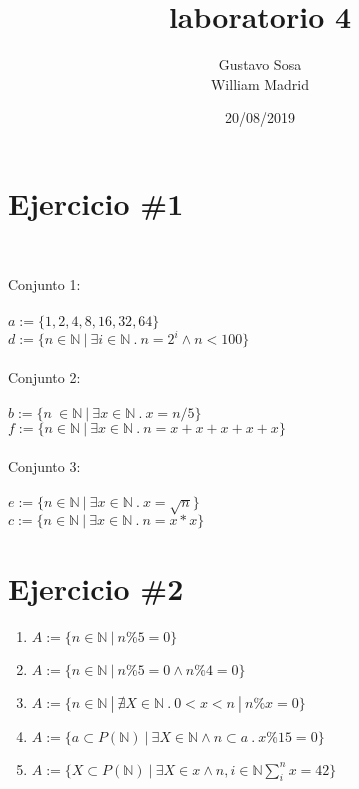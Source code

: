 \documentclass{article}
\title{laboratorio 4}
\author{Gustavo Sosa\\ William Madrid }
\date{20/08/2019}
\begin{document}
\maketitle

\section*{Ejercicio \#1}

\\\setlength{\parindent}{0cm}

        Conjunto 1:\\
        \\
        {$a:=\{1,2,4,8,16,32,64\}$}\\
        {$d:=\{n\in\mathbb{N}\ |\ \exists i\in\mathbb{N}\ .\ n=2^i\wedge n<100 \}$}\\
       \\
        Conjunto 2: \\
        \\
         {$b:=\{n\ \in \mathbb{N}\ |\ \exists x \in \mathbb{N}\ .\ x=n/5 \}$}\\
         {$f:=\{ n\in\mathbb{N}\ |\ \exists x\in \mathbb{N}\ .\ n=x+x+x+x+x \}$}\\
         \\
        Conjunto 3:\\
        \\
        {$e:=\{ n\in\mathbb{N}\ |\ \exists x\in \mathbb{N}\ .\ x=\sqrt{n} \}$}\\
       {$c:=\{n\in \mathbb{N}\ |\ \exists x\in\mathbb{N}\ .\ n=x*x \}$}\\



\section*{Ejercicio \#2}

\begin{enumerate}

        \item{$ A:= \{n \in \mathbb{N}\ |\ n \%  5= 0\}$}
        \item{$ A:= \{n \in \mathbb{N}\ |\ n \%  5= 0 \wedge n\% 4=0\}$}
        \item{$ A:= \{n \in \mathbb{N}\ |\ \nexists X \in \mathbb{N}\ .\   0 < x< n\ |\ n\% x= 0 \}$}
        \item{$ A:= \{a \subset P(\mathbb{N}) \ |\ \exists X \in \mathbb{N} \wedge n\subset a\ .\ x\% 15=0\}$}
        \item{$ A:= \{X \subset P(\mathbb{N})\ |\ \exists X\in  x \wedge n, i \in \mathbb{N} \sum_{i}^{n}x= 42 \}$}
     
\end{enumerate}
\end{document}
